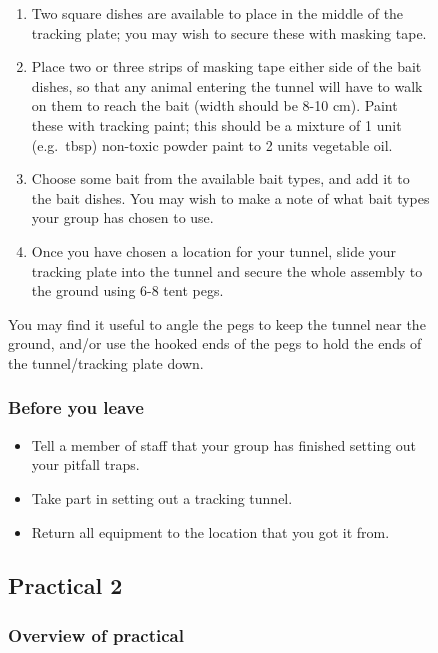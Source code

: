 \documentclass[
  letterpaper,
  DIV=11,
  numbers=noendperiod]{scrreprt}
\providecommand{\tightlist}{%
  \setlength{\itemsep}{0pt}\setlength{\parskip}{0pt}}
\begin{document}
\begin{figure}
{\begin{enumerate}
\def\labelenumi{\arabic{enumi}.}
\setcounter{enumi}{2}
\item
  Two square dishes are available to place in the middle of the tracking
  plate; you may wish to secure these with masking tape.
\item
  Place two or three strips of masking tape either side of the bait
  dishes, so that any animal entering the tunnel will have to walk on
  them to reach the bait (width should be 8-10 cm). Paint these with
  tracking paint; this should be a mixture of 1 unit (e.g.~tbsp)
  non-toxic powder paint to 2 units vegetable oil.
\item
  Choose some bait from the available bait types, and add it to the bait
  dishes. You may wish to make a note of what bait types your group has
  chosen to use.
\item
  Once you have chosen a location for your tunnel, slide your tracking
  plate into the tunnel and secure the whole assembly to the ground
  using 6-8 tent pegs.
\end{enumerate}

You may find it useful to angle the pegs to keep the tunnel near the
ground, and/or use the hooked ends of the pegs to hold the ends of the
tunnel/tracking plate down.

\subsubsection{Before you leave}\label{before-you-leave-1}

\begin{itemize}
\tightlist
\item
  Tell a member of staff that your group has finished setting out your
  pitfall traps.
\item
  Take part in setting out a tracking tunnel.
\item
  Return all equipment to the location that you got it from.
\end{itemize}

\subsection{Practical 2}\label{practical-2}

\subsubsection{Overview of practical}\label{overview-of-practical-2}

}
\end{figure}
\end{document}
